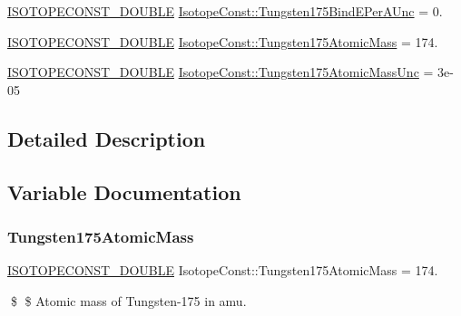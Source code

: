 \begin{DoxyCompactItemize}
\mbox{\hyperlink{group___isotope_const-_macros_ga8f45a7272ce02c0b4c65c44636ed719a}{I\+S\+O\+T\+O\+P\+E\+C\+O\+N\+S\+T\+\_\+\+D\+O\+U\+B\+LE}} \mbox{\hyperlink{group___isotope_const-_tungsten-_w175_gaf0786e54e059d4997f0cca81ea77337f}{Isotope\+Const\+::\+Tungsten175\+Bind\+E\+Per\+A\+Unc}} = 0.
\item 
\mbox{\hyperlink{group___isotope_const-_macros_ga8f45a7272ce02c0b4c65c44636ed719a}{I\+S\+O\+T\+O\+P\+E\+C\+O\+N\+S\+T\+\_\+\+D\+O\+U\+B\+LE}} \mbox{\hyperlink{group___isotope_const-_tungsten-_w175_ga48eea0dddb0d8509fc541cbab6b801de}{Isotope\+Const\+::\+Tungsten175\+Atomic\+Mass}} = 174.
\item 
\mbox{\hyperlink{group___isotope_const-_macros_ga8f45a7272ce02c0b4c65c44636ed719a}{I\+S\+O\+T\+O\+P\+E\+C\+O\+N\+S\+T\+\_\+\+D\+O\+U\+B\+LE}} \mbox{\hyperlink{group___isotope_const-_tungsten-_w175_ga73dcce62764e3e9cc9c546ffb97a0ebe}{Isotope\+Const\+::\+Tungsten175\+Atomic\+Mass\+Unc}} = 3e-\/05
\end{DoxyCompactItemize}


\subsection{Detailed Description}


\subsection{Variable Documentation}
\mbox{\label{group___isotope_const-_tungsten-_w175_ga48eea0dddb0d8509fc541cbab6b801de}} 
\subsubsection{\texorpdfstring{Tungsten175\+Atomic\+Mass}{Tungsten175AtomicMass}}
{\footnotesize\ttfamily \mbox{\hyperlink{group___isotope_const-_macros_ga8f45a7272ce02c0b4c65c44636ed719a}{I\+S\+O\+T\+O\+P\+E\+C\+O\+N\+S\+T\+\_\+\+D\+O\+U\+B\+LE}} Isotope\+Const\+::\+Tungsten175\+Atomic\+Mass = 174.}

\$ \$ Atomic mass of Tungsten-\/175 in amu. \mbox{\label{group___isotope_const-_tungsten-_w175_ga73dcce62764e3e9cc9c546ffb97a0ebe}} 
